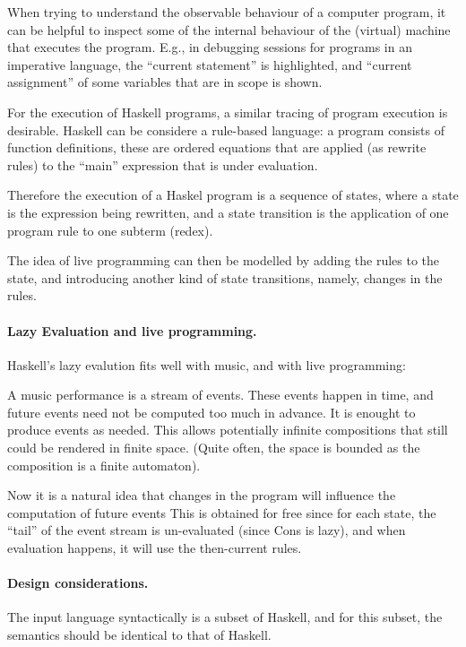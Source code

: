 \documentclass[a4paper]{easychair}
\begin{document}
When trying to understand the observable behaviour of a computer program,
it can be helpful to inspect some of the internal behaviour
of the (virtual) machine that executes the program.
E.g., in debugging sessions for programs in an imperative language,
the ``current statement'' is highlighted, and ``current assignment''
of some variables that are in scope is shown.

For the execution of Haskell programs, 
a similar tracing of program execution is desirable.
Haskell can be considere a rule-based language:
a program consists of function definitions,
these are ordered equations that are applied
(as rewrite rules) to the ``main'' expression that is under evaluation.

Therefore the execution of a Haskel program is a sequence of states,
where a state is the expression being rewritten,
and a state transition is the application of one program rule
to one subterm (redex).

The idea of live programming can then be modelled by
adding the rules to the state, and introducing another kind of
state transitions, namely, changes in the rules.

\paragraph{Lazy Evaluation and live programming.}

Haskell's lazy evalution fits well with music,
and with live programming:

A music performance is a stream of events.
These events happen in time, and future events need not be
computed too much in advance. It is enought to produce events as needed.
This allows potentially infinite compositions
that still could be rendered in finite space. 
(Quite often, the space is bounded as the composition is a finite automaton).

Now it is a natural idea that changes in the program
will influence the computation of future events
This is obtained for free since for each state,
the ``tail'' of the event stream is un-evaluated (since Cons is lazy),
and when evaluation happens, it will use the then-current rules.

\paragraph{Design considerations.}

The input language syntactically is a subset of Haskell,
and for this subset, the semantics should be identical to that of Haskell.
\end{document}
